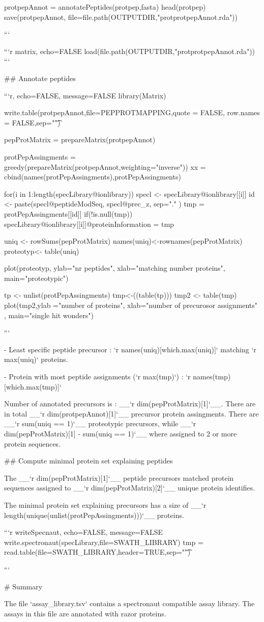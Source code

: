protpepAnnot = annotatePeptides(protpep,fasta)
head(protpep)
save(protpepAnnot, file=file.path(OUTPUTDIR,"protprotpepAnnot.rda"))

```


```{r matrix, echo=FALSE}
load(file.path(OUTPUTDIR,"protprotpepAnnot.rda"))
```

## Annotate peptides

```{r, echo=FALSE, message=FALSE}
library(Matrix)

write.table(protpepAnnot,file=PEPPROTMAPPING,quote = FALSE, row.names = FALSE,sep="\t")

pepProtMatrix = prepareMatrix(protpepAnnot)

protPepAssingments = greedy(prepareMatrix(protpepAnnot,weighting="inverse"))
xx = cbind(names(protPepAssingments),protPepAssingments)

for(i in 1:length(specLibrary@ionlibrary)){
  specl <- specLibrary@ionlibrary[[i]]
  id <- paste(specl@peptideModSeq, specl@prec_z, sep="." )
  tmp = protPepAssingments[[id]]
  if(!is.null(tmp)){
    specLibrary@ionlibrary[[i]]@proteinInformation = tmp
  }
}

uniq <- rowSums(pepProtMatrix)
names(uniq)<-rownames(pepProtMatrix)
proteotyp<- table(uniq)

plot(proteotyp, ylab="nr peptides", xlab="matching number proteins", main="proteotypic")

tp <- unlist(protPepAssingments)
tmp<-((table(tp)))
tmp2 <- table(tmp)
plot(tmp2,ylab ="number of proteins",  xlab="number of precurosor assignments" , main="single hit wonders")

```

- Least specific peptide precursor : `r names(uniq)[which.max(uniq)]` matching 
`r max(uniq)` proteins.

- Protein with most peptide assignments (`r max(tmp)`) : `r names(tmp)[which.max(tmp)]`  


Number of annotated precursors is : __`r dim(pepProtMatrix)[1]`__.
There are in total __`r dim(protpepAnnot)[1]`__ precursor protein assingments.
There are __`r sum(uniq == 1)`__ proteotypic precursors, while __`r dim(pepProtMatrix)[1] - sum(uniq == 1)`__ where assigned to 2 or more protein sequences.

## Compute minimal protein set explaining peptides

The __`r dim(pepProtMatrix)[1]`__ peptide precursors matched protein sequences assigned to __`r dim(pepProtMatrix)[2]`__ unique protein identifies.

The minimal protein set explaining precursors has a size of __`r length(unique(unlist(protPepAssingments)))`__ proteins.

```{r writeSpecnaut, echo=FALSE, message=FALSE}
write.spectronaut(specLibrary,file=SWATH_LIBRARY)
tmp = read.table(file=SWATH_LIBRARY,header=TRUE,sep="\t")

```


# Summary

The file `assay_library.tsv` contains a spectronaut compatible assay library. The assays in this file are annotated with razor proteins.

